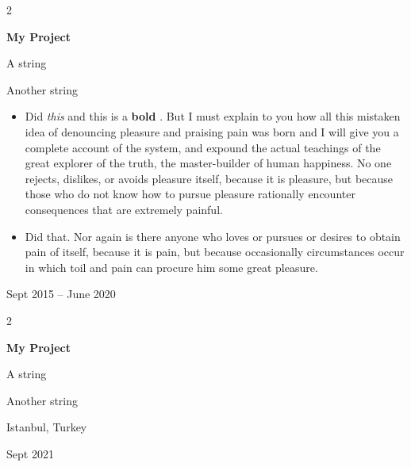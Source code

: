 \documentclass[10pt, letterpaper]{article}
\newenvironment{summary}{
    \begin{description}[
        topsep=0.10 cm,
        parsep=0.10 cm,
        partopsep=0pt,
        itemsep=0pt,
        leftmargin=0.4 cm + 10pt
    ]
}{
    \end{description}
} %
\newenvironment{highlights}{
    \begin{itemize}[
        topsep=0.10 cm,
        parsep=0.10 cm,
        partopsep=0pt,
        itemsep=0pt,
        leftmargin=0.4 cm + 10pt
    ]
}{
    \end{itemize}
} %
\newenvironment{twocolentry}[2][]{
    \onecolentry
    \def\secondColumn{#2}
    \setcolumnwidth{\fill, 4.5 cm}
    \begin{paracol}{2}
}{
    \switchcolumn \raggedleft \secondColumn
    \end{paracol}
    \endonecolentry
} %
\let\hrefWithoutArrow\href
\renewcommand{\href}[2]{\hrefWithoutArrow{#1}{\ifthenelse{\equal{#2}{}}{ }{#2 }\raisebox{.15ex}{\footnotesize \faExternalLink*}}}
\begin{document}
        \vspace{0.2 cm}

        \begin{twocolentry}{
            Sept 2015 – June 2020
        }
            \textbf{My Project}
            \begin{summary}
                \item A string
                \item Another string
            \end{summary}
            \begin{highlights}
                \item Did \textit{this} and this is a \textbf{bold} \href{https://example.com}{link}. But I must explain to you how all this mistaken idea of denouncing pleasure and praising pain was born and I will give you a complete account of the system, and expound the actual teachings of the great explorer of the truth, the master-builder of human happiness. No one rejects, dislikes, or avoids pleasure itself, because it is pleasure, but because those who do not know how to pursue pleasure rationally encounter consequences that are extremely painful.
                \item Did that. Nor again is there anyone who loves or pursues or desires to obtain pain of itself, because it is pain, but because occasionally circumstances occur in which toil and pain can procure him some great pleasure.
            \end{highlights}
        \end{twocolentry}


        \vspace{0.2 cm}

        \begin{twocolentry}{
            Istanbul, Turkey

        Sept 2021
        }
            \textbf{My Project}
            \begin{summary}
                \item A string
                \item Another string
            \end{summary}
        \end{twocolentry}


        \vspace{0.2 cm}
\end{document}
